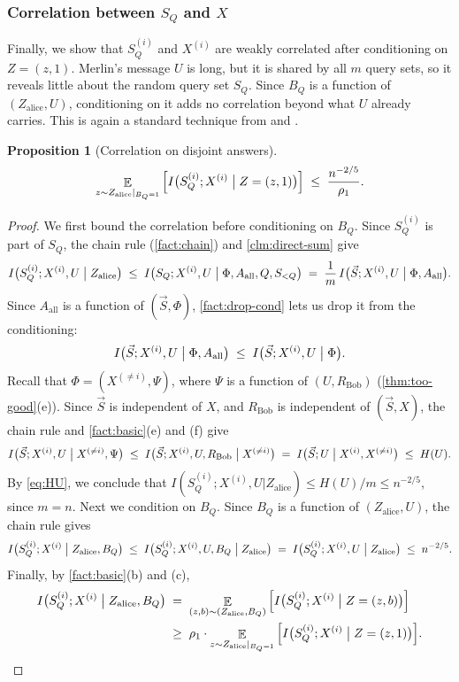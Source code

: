 \documentclass[11pt]{article}
\theoremstyle{plain}
\newtheorem{proposition}[theorem]{Proposition}
\theoremstyle{definition}
\theoremstyle{remark}
\newcommand{\E}{\mathop{\mathbb{E}}}
\newcommand{\vS}{\vec{S}}
\newcommand{\Aall}{A_{\mathrm{all}}}
\begin{document}
\subsubsection{Correlation between \texorpdfstring{$S_Q$}{S\_Q} and \texorpdfstring{$X$}{X}}

Finally, we show that $S_Q^{(i)}$ and $X^{(i)}$ are weakly correlated after conditioning on $Z = (z, 1)$. Merlin's message $U$ is long, but it is shared by all $m$ query sets, so it reveals little about the random query set $S_Q$. Since $B_Q$ is a function of $(Z_{\mathrm{alice}}, U)$, conditioning on it adds no correlation beyond what $U$ already carries. This is again a standard technique from \cite{ko_adaptive_2020} and \cite{ko_omega_2026}.

\begin{proposition}[Correlation on disjoint answers]\label{prop:key}
\[ \E_{z \sim Z_{\mathrm{alice}}|_{B_Q=1}}\Big[I\big(S_Q^{(i)}; X^{(i)} \bigm| Z = (z, 1)\big)\Big] \;\le\; \frac{n^{-2/5}}{\rho_1}. \]
\end{proposition}
\begin{proof}
We first bound the correlation before conditioning on $B_Q$. Since $S_Q^{(i)}$ is part of $S_Q$, the chain rule (\cref{fact:chain}) and \cref{clm:direct-sum} give
\[ I\big(S_Q^{(i)}; X^{(i)}, U \bigm| Z_{\mathrm{alice}}\big) \;\le\; I\big(S_Q; X^{(i)}, U \bigm| \Phi, \Aall, Q, S_{<Q}\big) \;=\; \frac1m\, I\big(\vS; X^{(i)}, U \bigm| \Phi, \Aall\big). \]
Since $\Aall$ is a function of $(\vS, \Phi)$, \cref{fact:drop-cond} lets us drop it from the conditioning:
\[ I\big(\vS; X^{(i)}, U \bigm| \Phi, \Aall\big) \;\le\; I\big(\vS; X^{(i)}, U \bigm| \Phi\big). \]
Recall that $\Phi = (X^{(\ne i)}, \Psi)$, where $\Psi$ is a function of $(U, R_{\mathrm{Bob}})$ (\cref{thm:too-good}(e)). Since $\vS$ is independent of $X$, and $R_{\mathrm{Bob}}$ is independent of $(\vS, X)$, the chain rule and \cref{fact:basic}(e) and (f) give
\[ I\big(\vS; X^{(i)}, U \bigm| X^{(\ne i)}, \Psi\big) \;\le\; I\big(\vS; X^{(i)}, U, R_{\mathrm{Bob}} \bigm| X^{(\ne i)}\big) \;=\; I\big(\vS; U \bigm| X^{(i)}, X^{(\ne i)}\big) \;\le\; H(U). \]
By \eqref{eq:HU}, we conclude that $I(S_Q^{(i)}; X^{(i)}, U | Z_{\mathrm{alice}}) \le H(U)/m \le n^{-2/5}$, since $m = n$. Next we condition on $B_Q$. Since $B_Q$ is a function of $(Z_{\mathrm{alice}}, U)$, the chain rule gives
\[ I\big(S_Q^{(i)}; X^{(i)} \bigm| Z_{\mathrm{alice}}, B_Q\big) \;\le\; I\big(S_Q^{(i)}; X^{(i)}, U, B_Q \bigm| Z_{\mathrm{alice}}\big) \;=\; I\big(S_Q^{(i)}; X^{(i)}, U \bigm| Z_{\mathrm{alice}}\big) \;\le\; n^{-2/5}. \]
Finally, by \cref{fact:basic}(b) and (c),
\begin{align*}
I\big(S_Q^{(i)}; X^{(i)} \bigm| Z_{\mathrm{alice}}, B_Q\big) \;&=\; \E_{(z,b) \sim (Z_{\mathrm{alice}}, B_Q)}\Big[I\big(S_Q^{(i)}; X^{(i)} \bigm| Z = (z, b)\big)\Big] \\
\;&\ge\; \rho_1 \cdot \E_{z \sim Z_{\mathrm{alice}}|_{B_Q=1}}\Big[I\big(S_Q^{(i)}; X^{(i)} \bigm| Z = (z, 1)\big)\Big]. \qedhere
\end{align*}
\end{proof}
\end{document}
